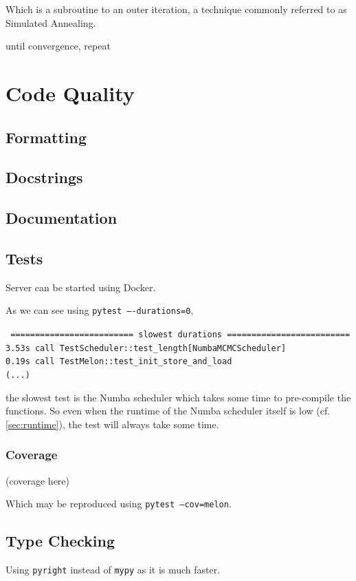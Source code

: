 \documentclass{prettytex/ox/mmsc-special-topic}
\begin{document}
  Which is a subroutine to an outer iteration, a technique commonly referred to as Simulated Annealing.

  \begin{algorithm}[language=pseudo,caption={\centering Simulated Annealing},basicstyle=\footnotesize]
until convergence, repeat
  \end{algorithm}

  \section{Code Quality}
  \subsection{Formatting}
  \subsection{Docstrings}
  \subsection{Documentation}
  \subsection{Tests}
  Server can be started using Docker.

  As we can see using \texttt{pytest ----durations=0},

  \texttt{
    ========================= slowest durations ========================= \\
    3.53s call TestScheduler::test\_length[NumbaMCMCScheduler] \\
    0.19s call TestMelon::test\_init\_store\_and\_load \\
    (...)
  }

  the slowest test is the Numba scheduler which takes some time to pre-compile the functions.
  So even when the runtime of the Numba scheduler itself is low (cf. \cref{sec:runtime}), the test will always take some time.

  \subsubsection{Coverage}

  (coverage here)

  Which may be reproduced using \texttt{pytest --cov=melon}.

  \subsection{Type Checking}
  Using \texttt{pyright} instead of \texttt{mypy} as it is much faster.
\end{document}
